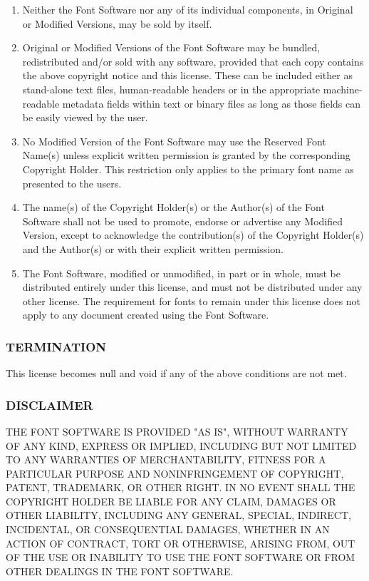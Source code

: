 \documentclass[a4paper, 12pt]{article}
\begin{document}
\begin{enumerate}
\item Neither the Font Software nor any of its individual components,
in Original or Modified Versions, may be sold by itself.

\item Original or Modified Versions of the Font Software may be bundled,
redistributed and/or sold with any software, provided that each copy
contains the above copyright notice and this license. These can be
included either as stand-alone text files, human-readable headers or
in the appropriate machine-readable metadata fields within text or
binary files as long as those fields can be easily viewed by the user.

\item  No Modified Version of the Font Software may use the Reserved Font
Name(s) unless explicit written permission is granted by the corresponding
Copyright Holder. This restriction only applies to the primary font name as
presented to the users.

\item  The name(s) of the Copyright Holder(s) or the Author(s) of the Font
Software shall not be used to promote, endorse or advertise any
Modified Version, except to acknowledge the contribution(s) of the
Copyright Holder(s) and the Author(s) or with their explicit written
permission.

\item The Font Software, modified or unmodified, in part or in whole,
must be distributed entirely under this license, and must not be
distributed under any other license. The requirement for fonts to
remain under this license does not apply to any document created
using the Font Software.


\end{enumerate}


\subsubsection{TERMINATION}

This license becomes null and void if any of the above conditions are
not met.

\subsubsection{DISCLAIMER}

THE FONT SOFTWARE IS PROVIDED "AS IS", WITHOUT WARRANTY OF ANY KIND,
EXPRESS OR IMPLIED, INCLUDING BUT NOT LIMITED TO ANY WARRANTIES OF
MERCHANTABILITY, FITNESS FOR A PARTICULAR PURPOSE AND NONINFRINGEMENT
OF COPYRIGHT, PATENT, TRADEMARK, OR OTHER RIGHT. IN NO EVENT SHALL THE
COPYRIGHT HOLDER BE LIABLE FOR ANY CLAIM, DAMAGES OR OTHER LIABILITY,
INCLUDING ANY GENERAL, SPECIAL, INDIRECT, INCIDENTAL, OR CONSEQUENTIAL
DAMAGES, WHETHER IN AN ACTION OF CONTRACT, TORT OR OTHERWISE, ARISING
FROM, OUT OF THE USE OR INABILITY TO USE THE FONT SOFTWARE OR FROM
OTHER DEALINGS IN THE FONT SOFTWARE.
\end{document}
